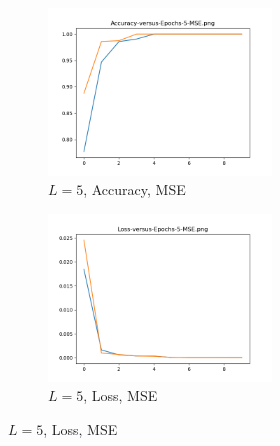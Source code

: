 \begin{figure}[!htbp]
\begin{subfigure}
\centering
\includegraphics[angle=0,width=0.65\textwidth]{assign-3/logs/Accuracy-5-MSE-hidden-5.png}
\caption{$L=5$, Accuracy, MSE}
\end{subfigure}
\begin{subfigure}
\centering
\includegraphics[angle=0,width=0.65\textwidth]{assign-3/logs/Loss-5-MSE-hidden-5.png}
\caption{$L=5$, Loss, MSE}
\end{subfigure}
\end{figure}

